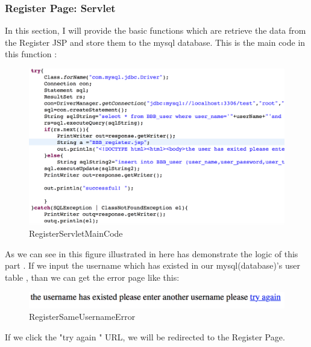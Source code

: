 \documentclass[12pt]{article}
\begin{document}
\newpage
\subsubsection{Register Page: Servlet}



In this section, I will provide the basic functions which are retrieve the data from the Register JSP and store them to the mysql database. This is  the main code in this function :
\begin{figure}[H]
	\centering	
	\includegraphics[width=15cm]{images/RegisterServletMainCode.jpg}
	\caption[RegisterServletMainCode]{RegisterServletMainCode}
	\label{fig:RegisterServletMainCode}
\end{figure}

As we can see in this figure illustrated in here has demonstrate the logic of this part . If we input the username which has existed in our mysql(database)'s user table , than we can get the error page like this:
\begin{figure}[H]
	\centering	
	\includegraphics[width=15cm]{images/RegisterSameUsernameError.jpg}

	\caption[RegisterSameUsernameError]{RegisterSameUsernameError}
	\label{fig:RegisterSameUsernameError}
\end{figure}

	If we click the "try again " URL, we will be redirected to the Register Page.

\newpage

\end{document}

